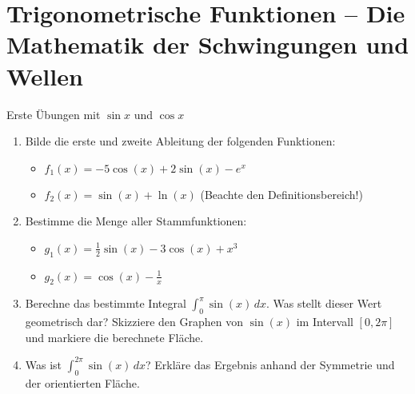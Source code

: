 
\section{Trigonometrische Funktionen – Die Mathematik der Schwingungen und Wellen}
\label{sec:trigonometrische_funktionen}

\begin{aufgabenumgebung}{Erste Übungen mit $\sin x$ und $\cos x$}
\begin{enumerate}
    \item Bilde die erste und zweite Ableitung der folgenden Funktionen:
        \begin{itemize}
            \item $f_1(x) = -5\cos(x) + 2\sin(x) - e^x$
            \item $f_2(x) = \sin(x) + \ln(x)$ (Beachte den Definitionsbereich!)
        \end{itemize}
    \item Bestimme die Menge aller Stammfunktionen:
        \begin{itemize}
            \item $g_1(x) = \frac{1}{2}\sin(x) - 3\cos(x) + x^3$
            \item $g_2(x) = \cos(x) - \frac{1}{x}$
        \end{itemize}
    \item Berechne das bestimmte Integral $\int_0^{\pi} \sin(x) \,dx$. Was stellt dieser Wert geometrisch dar? Skizziere den Graphen von $\sin(x)$ im Intervall $[0, 2\pi]$ und markiere die berechnete Fläche.
    \item Was ist $\int_0^{2\pi} \sin(x) \,dx$? Erkläre das Ergebnis anhand der Symmetrie und der orientierten Fläche.
\end{enumerate}
\end{aufgabenumgebung}



